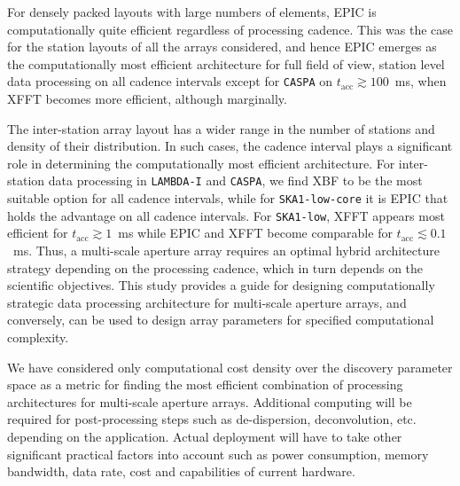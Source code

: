 \documentclass[
  journal=pasa,
  manuscript=article-type,
  year=2020,
  volume=37,
]{cup-journal}
\begin{document}
For densely packed layouts with large numbers of elements, EPIC is computationally quite efficient regardless of processing cadence. This was the case for the station layouts of all the arrays considered, and hence EPIC emerges as the computationally most efficient architecture for full field of view, station level data processing on all cadence intervals except for \texttt{CASPA} on $t_\textrm{acc}\gtrsim 100$~ms, when XFFT becomes more efficient, although marginally. 

The inter-station array layout has a wider range in the number of stations and density of their distribution. In such cases, the cadence interval plays a significant role in determining the computationally most efficient architecture. For inter-station data processing in \texttt{LAMBDA-I} and \texttt{CASPA}, we find XBF to be the most suitable option for all cadence intervals, while for \texttt{SKA1-low-core} it is EPIC that holds the advantage on all cadence intervals. For \texttt{SKA1-low}, XFFT appears most efficient for $t_\textrm{acc}\gtrsim 1$~ms while EPIC and XFFT become comparable for $t_\textrm{acc}\lesssim 0.1$~ms. Thus, a multi-scale aperture array requires an optimal hybrid architecture strategy depending on the processing cadence, which in turn depends on the scientific objectives. This study provides a guide for designing computationally strategic data processing architecture for multi-scale aperture arrays, and conversely, can be used to design array parameters for specified computational complexity. 

We have considered only computational cost density over the discovery parameter space as a metric for finding the most efficient combination of processing architectures for multi-scale aperture arrays. Additional computing will be required for post-processing steps such as de-dispersion, deconvolution, etc. depending on the application. Actual deployment will have to take other significant practical factors into account such as power consumption, memory bandwidth, data rate, cost and capabilities of current hardware.

\end{document}
